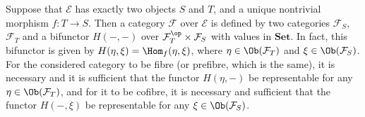 \begin{example}\label{fibre cat given by a Hom functor}
Suppose that $\mathcal{E}$ has exactly two objects $S$ and $T$, and a unique nontrivial morphism $f:T\to S$. Then a category $\mathcal{F}$ over $\mathcal{E}$ is defined by two categories $\mathcal{F}_S$, $\mathcal{F}_T$ and a bifunctor $H(-,-)$ over $\mathcal{F}_T^\op\times\mathcal{F}_S$ with values in $\mathbf{Set}$. In fact, this bifunctor is given by $H(\eta,\xi)=\Hom_f(\eta,\xi)$, where $\eta\in\Ob(\mathcal{F}_T)$ and $\xi\in\Ob(\mathcal{F}_S)$. For the considered category to be fibre (or prefibre, which is the same), it is necessary and it is sufficient that the functor $H(\eta,-)$ be representable for any $\eta\in\Ob(\mathcal{F}_T)$, and for it to be cofibre, it is necessary and sufficient that the functor $H(-,\xi)$ be representable for any $\xi\in\Ob(\mathcal{F}_S)$.
\end{example}
